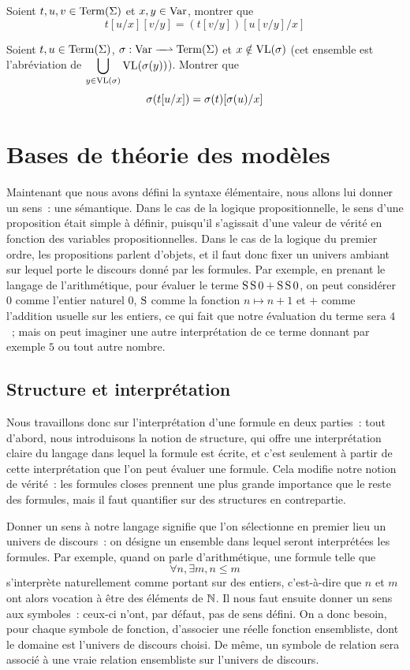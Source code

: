 \begin{exercise}
  Soient $t,u,v\in\operatorname{Term}(\Sigma)$ et $x,y\in\operatorname{Var}$, montrer que
  \[t[u/x][v/y] = (t[v/y])[u[v/y]/x]\]
\end{exercise}

\begin{exercise}
  Soient $t,u\in\operatorname{Term}(\Sigma)$,
  $\makeFunNamePartial{\subSimul}{\Var}{\Term(\Sign)}$ et
  $x \notin \operatorname{VL}(\sigma)$ (cet ensemble est l'abréviation de
  $\displaystyle\bigcup_{y \in \operatorname{VL}(\sigma)} \operatorname{VL}(\sigma(y))$). Montrer que
  \[\sigma(t[u/x]) = \sigma(t)[\sigma(u)/x]\]
\end{exercise}

\section{Bases de théorie des modèles}

Maintenant que nous avons défini la syntaxe élémentaire, nous allons lui donner
un sens~: une sémantique. Dans le cas de la logique propositionnelle, le sens
d'une proposition était simple à définir, puisqu'il s'agissait d'une valeur de
vérité en fonction des variables propositionnelles. Dans le cas de la logique du
premier ordre, les propositions parlent d'objets, et il faut donc fixer un
univers ambiant sur lequel porte le discours donné par les formules. Par
exemple, en prenant le langage de l'arithmétique, pour évaluer le terme
$\operatorname{S}\operatorname{S} 0 + \operatorname{S}\operatorname{S} 0$, on peut considérer $0$ comme l'entier naturel $0$, $\operatorname{S}$
comme la fonction $n \mapsto n + 1$ et $+$ comme l'addition usuelle sur les
entiers, ce qui fait que notre évaluation du terme sera $4$~;
mais on peut imaginer une autre interprétation de ce terme donnant par exemple
$5$ ou tout autre nombre.

\subsection{Structure et interprétation}

Nous travaillons donc sur l'interprétation d'une formule en deux parties~: tout
d'abord, nous introduisons la notion de structure, qui offre une interprétation
claire du langage dans lequel la formule est écrite, et c'est seulement à partir
de cette interprétation que l'on peut évaluer une formule. Cela modifie notre
notion de vérité~: les formules closes prennent une plus grande importance que
le reste des formules, mais il faut quantifier sur des structures en
contrepartie.

Donner un sens à notre langage signifie que l'on sélectionne en premier lieu un
univers de discours~: on désigne un ensemble dans lequel seront interprétées
les formules. Par exemple, quand on parle d'arithmétique, une formule telle que
\[\forall n,\exists m, n \leq m\]
s'interprète naturellement comme portant sur des entiers, c'est-à-dire que $n$
et $m$ ont alors vocation à être des éléments de $\mathbb N$. Il nous faut
ensuite donner un sens aux symboles~: ceux-ci n'ont, par défaut, pas de sens
défini. On a donc besoin, pour chaque symbole de fonction, d'associer une
réelle fonction ensembliste, dont le domaine est l'univers de discours choisi.
De même, un symbole de relation sera associé à une vraie relation ensembliste
sur l'univers de discours.

